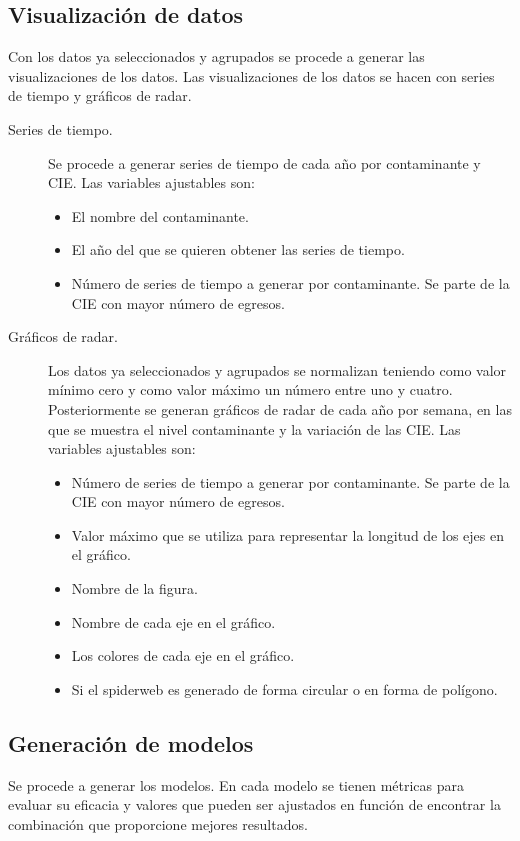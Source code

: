 \subsection{Visualización de datos}
Con los datos ya seleccionados y agrupados se procede a generar las visualizaciones de los datos. Las visualizaciones de los datos se hacen con series de tiempo y gráficos de radar.

\begin{description}
\item [Series de tiempo.] {Se procede a generar series de tiempo de cada año por contaminante y CIE}. Las variables ajustables son:
\begin{itemize}
	\item El nombre del contaminante.
	\item El año del que se quieren obtener las series de tiempo.
	\item Número de series de tiempo a generar por contaminante. Se parte de la CIE con mayor número de egresos.
\end{itemize}

\item [Gráficos de radar.] {Los datos ya seleccionados y agrupados se normalizan teniendo como valor mínimo cero y como valor máximo un número entre uno y cuatro. Posteriormente se generan gráficos de radar de cada año por semana, en las que se muestra el nivel contaminante y la variación de las CIE}. Las variables ajustables son:
\begin{itemize}
    \item Número de series de tiempo a generar por contaminante. Se parte de la CIE con mayor número de egresos.
	\item Valor máximo que se utiliza para representar la longitud de los ejes en el gráfico.
	\item Nombre de la figura.
	\item Nombre de cada eje en el gráfico.
	\item Los colores de cada eje en el gráfico. 
	\item Si el spiderweb es generado de forma circular o en forma de polígono.
\end{itemize}
\end{description}

\subsection{Generación de modelos}
Se procede a generar los modelos. En cada modelo se tienen métricas para evaluar su eficacia y valores que pueden ser ajustados en función de encontrar la combinación que proporcione mejores resultados.


